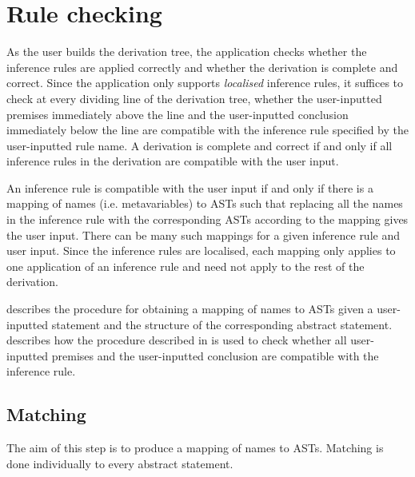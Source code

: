 \chapter{Rule checking}
\label{chapter:checking}
As the user builds the derivation tree, the application checks whether the inference rules are applied correctly and whether the derivation is complete and correct. Since the application only supports \textit{localised} inference rules, it suffices to check at every dividing line of the derivation tree, whether the user-inputted premises immediately above the line and the user-inputted conclusion immediately below the line are compatible with the inference rule specified by the user-inputted rule name. A derivation is complete and correct if and only if all inference rules in the derivation are compatible with the user input.

An inference rule is compatible with the user input if and only if there is a mapping of names (i.e. metavariables) to ASTs such that replacing all the names in the inference rule with the corresponding ASTs according to the mapping gives the user input. There can be many such mappings for a given inference rule and user input. Since the inference rules are localised, each mapping only applies to one application of an inference rule and need not apply to the rest of the derivation.

 describes the procedure for obtaining a mapping of names to ASTs given a user-inputted statement and the structure of the corresponding abstract statement.  describes how the procedure described in  is used to check whether all user-inputted premises and the user-inputted conclusion are compatible with the inference rule.

\section{Matching}
\label{checking:matching}
The aim of this step is to produce a mapping of names to ASTs. Matching is done individually to every abstract statement.


